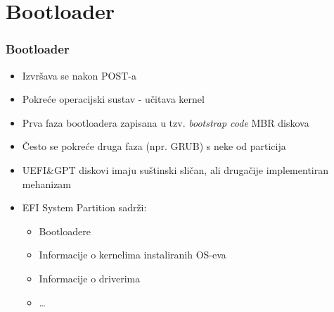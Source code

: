 \documentclass[t]{beamer}
\begin{document}
\section{Bootloader}
\begin{frame}
	\frametitle{Bootloader}
	\begin{itemize}
		\item Izvršava se nakon POST-a
		\item Pokreće operacijski sustav - učitava kernel
	\end{itemize}
	
	\begin{itemize}
		\item Prva faza bootloadera zapisana u tzv. \textit{bootstrap code} MBR diskova
		\item Često se pokreće druga faza (npr. GRUB) s neke od particija
	\end{itemize}
	\begin{itemize}
		\item UEFI\&GPT diskovi imaju suštinski sličan, ali drugačije implementiran mehanizam
		\item EFI System Partition sadrži:
		\begin{itemize}
	 		\item Bootloadere
	 		\item Informacije o kernelima instaliranih OS-eva
	 		\item Informacije o driverima
	 		\item \dots
		\end{itemize}
	\end{itemize}
\end{frame}
\end{document}
